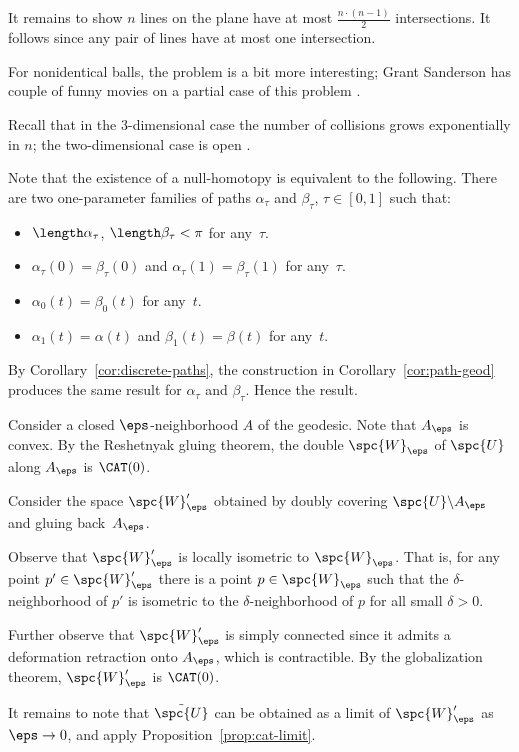 It remains to show $n$ lines on the plane have at most $\tfrac{n\cdot(n-1)}2$ intersections.
It follows since any pair of lines have at most one intersection.

For nonidentical balls, the problem is a bit more interesting;
Grant Sanderson has couple of funny movies on a partial case of this problem \cite{sanderson}.

Recall that in the 3-dimensional case the number of collisions grows exponentially in $n$; the two-dimensional case is open \cite{burago-ivanov}.

Note that the existence of a null-homotopy is equivalent to the following.
There are two one-parameter families of paths $\alpha_\tau$ and $\beta_\tau$, $\tau\in[0,1]$ 
such that: 
\begin{itemize}
\item $\length\alpha_\tau$, $\length\beta_\tau<\pi$ for any~$\tau$.
\item $\alpha_\tau(0)=\beta_\tau(0)$ and $\alpha_\tau(1)=\beta_\tau(1)$ for any~$\tau$.
\item $\alpha_0(t)=\beta_0(t)$ for any~$t$.
\item $\alpha_1(t)=\alpha(t)$ and $\beta_1(t)=\beta(t)$ for any~$t$.
\end{itemize}

By Corollary~\ref{cor:discrete-paths},
the construction in Corollary~\ref{cor:path-geod} produces the same result for $\alpha_\tau$ and $\beta_\tau$.
Hence the result.

Consider a closed $\eps$-neighborhood $A$ of the geodesic.
Note that $A_\eps$ is convex.
By the Reshetnyak gluing theorem, the double $\spc{W}_\eps$ of $\spc{U}$ along $A_\eps$ is $\CAT(0)$.

Consider the space $\spc{W}'_\eps$ obtained by doubly covering $\spc{U}\backslash A_\eps$ and gluing back~$A_\eps$.

Observe that $\spc{W}'_\eps$ is locally isometric to $\spc{W}_\eps$. 
That is, for any point $p'\in\spc{W}'_\eps$ there is a point $p\in\spc{W}_\eps$ such that the $\delta$-neighborhood of $p'$ is isometric to the $\delta$-neighborhood of $p$ for all small $\delta>0$.

Further observe that $\spc{W}'_\eps$ is simply connected since it admits a deformation retraction onto $A_\eps$, which is contractible.
By the globalization theorem, $\spc{W}'_\eps$ is $\CAT(0)$.

It remains to note that $\tilde {\spc{U}}$ can be obtained as a limit of $\spc{W}'_\eps$ as $\eps\to 0$, and apply Proposition~\ref{prop:cat-limit}.

